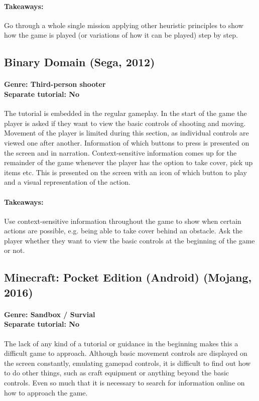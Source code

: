 \paragraph{Takeaways:}
Go through a whole single mission applying other heuristic principles to show how the game is played (or variations of how it can be played) step by step.

\subsection{Binary Domain (Sega, 2012)}
\paragraph{Genre: Third-person shooter \\ Separate tutorial: No \\} 
The tutorial is embedded in the regular gameplay. In the start of the game the player is asked if they want to view the basic controls of shooting and moving. Movement of the player is limited during this section, as individual controls are viewed one after another. Information of which buttons to press is presented on the screen and in narration. Context-sensitive information comes up for the remainder of the game whenever the player has the option to take cover, pick up items etc. This is presented on the screen with an icon of which button to play and a visual representation of the action.
\paragraph{Takeaways:}
Use context-sensitive information throughout the game to show when certain actions are possible, e.g. being able to take cover behind an obstacle. Ask the player whether they want to view the basic controls at the beginning of the game or not.

\subsection{Minecraft: Pocket Edition (Android) (Mojang, 2016)}
\paragraph{Genre: Sandbox / Survial \\ Separate tutorial: No \\}
The lack of any kind of a tutorial or guidance in the beginning makes this a difficult game to approach. Although basic movement controls are displayed on the screen constantly, emulating gamepad controls, it is difficult to find out how to do other things, such as craft equipment or anything beyond the basic controls. Even so much that it is necessary to search for information online on how to approach the game. 
